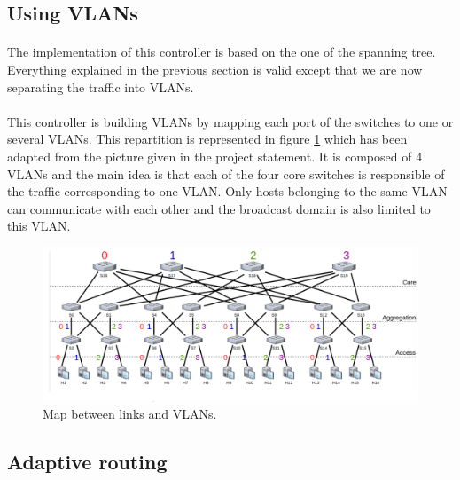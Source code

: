\documentclass[a4paper, 11pt, oneside]{article}
\begin{document}
\subsection{Using VLANs}
\paragraph{}The implementation of this controller is based on the one of the spanning tree. Everything explained in the previous section is valid except that we are now separating the traffic into VLANs.
\paragraph{}This controller is building VLANs by mapping each port of the switches to one or several VLANs. This repartition is represented in figure \ref{VLANs_rep} which has been adapted from the picture given in the project statement. It is composed of 4 VLANs and the main idea is that each of the four core switches is responsible of the traffic corresponding to one VLAN. 
Only hosts belonging to the same VLAN can communicate with each other and the broadcast domain is also limited to this VLAN.

\begin{figure}[H]
    \center
    \includegraphics[scale = 0.4]{VLANs/VLANs.png}
    \caption{Map between links and VLANs.}
    \label{VLANs_rep}
    \end{figure}

\subsection{Adaptive routing} \label{subsec:adaptive}
\end{document}
